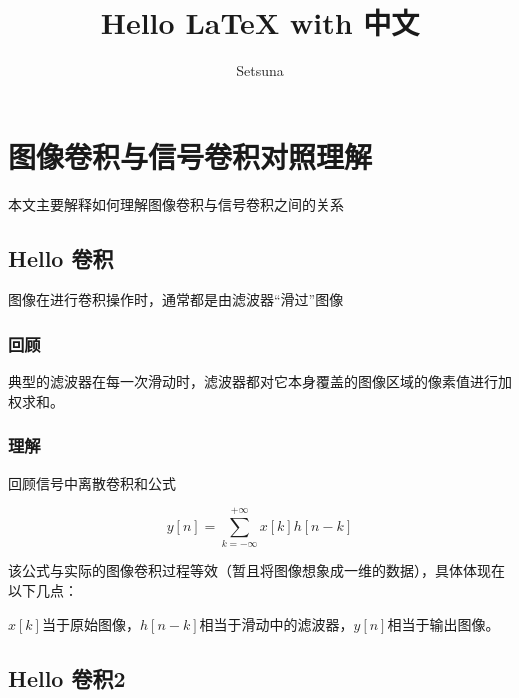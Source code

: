 \documentclass{article}
\title{Hello LaTeX with 中文}
\author{Setsuna}
\begin{document}
\maketitle
\section{图像卷积与信号卷积对照理解}
本文主要解释如何理解图像卷积与信号卷积之间的关系

  \subsection{Hello 卷积}
  图像在进行{卷积}操作时，通常都是由滤波器“滑过”图像

  \subsubsection{回顾}
  典型的滤波器在每一次滑动时，滤波器都对它本身覆盖的图像区域的像素值进行加权求和。

  \subsubsection{理解}
  回顾信号中离散卷积和公式

  $$y\left[ n \right] = \sum\limits_{k =  - \infty }^{ + \infty } {x\left[ k \right]h\left[ {n - k} \right]}$$

  该公式与实际的图像卷积过程等效（暂且将图像想象成一维的数据），具体体现在以下几点：

  ${x\left[ k \right]}$当于原始图像，${h\left[ {n - k} \right]}$相当于滑动中的滤波器，$y\left[ n \right]$相当于输出图像。

  \subsection{Hello 卷积2}
\end{document}
